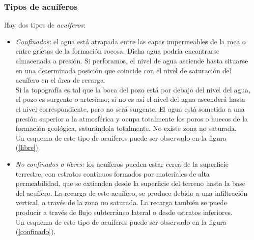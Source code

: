 \documentclass[10pt,a4paper,final]{article}
\begin{document}
\subsubsection*{Tipos de acuíferos}
Hay dos tipos de \emph{acuíferos}: 
\begin{itemize}
\item \emph{Confinados: }el agua está atrapada entre las capas impermeables de la roca o entre grietas de la formación rocosa. Dicha agua podría encontrarse almacenada a presión. Si perforamos, el nivel de agua asciende hasta situarse en una determinada posición que coincide con el nivel de saturación del acuífero en el área de recarga.\\
Si la topografía es tal que la boca del pozo está por debajo del nivel del agua, el pozo es
surgente o artesiano; si no es así el nivel del agua ascenderá hasta el nivel correspondiente, pero no será surgente. El agua está sometida a una presión superior a la atmosférica y ocupa totalmente los poros o huecos de la formación geológica, saturándola totalmente. No existe zona no saturada. \\ Un esquema de este tipo de acuíferos puede ser observado en la figura (\ref{libre}).
%
\item \emph{No confinados o libres: } los acuíferos pueden estar cerca de la superficie terrestre, con estratos continuos formados por materiales de alta permeabilidad, que se extienden desde la superficie del terreno hasta la base del acuífero. La recarga de este acuífero, se produce debido a una infiltración vertical, a través de la zona no saturada. La recarga también se puede producir a través de flujo subterráneo lateral o desde estratos inferiores.\\
Un esquema de este tipo de acuíferos puede ser observado en la figura (\ref{confinado}).
\end{itemize}
%
\end{document}
